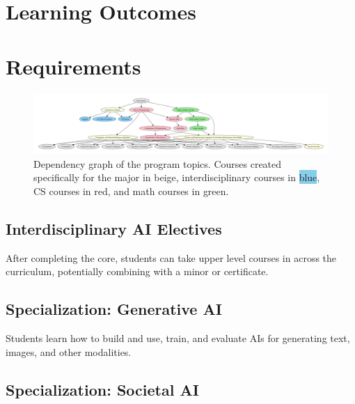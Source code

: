 \documentclass[
10pt, %
a4paper, %
oneside, %
headinclude,footinclude, %
BCOR5mm, %
]{scrartcl}
\begin{document}
\section{Learning Outcomes}



\section{Requirements}

\begin{figure}

  \includegraphics[width=1.2\linewidth]{dependency_graph/all}
  \caption{Dependency graph of the program topics.  Courses created specifically for the \ai{} major in \colorbox{yellow!30}{beige}, interdisciplinary courses in \colorbox{SkyBlue}{blue}, CS courses in \colorbox{red!30}{red}, and math courses in \colorbox{green!30}{green}.}
\end{figure}


  

\subsection{Interdisciplinary AI Electives}

After completing the core, students can take upper level courses in \ai{} across the curriculum, potentially combining with a minor or certificate.



\subsection{Specialization: Generative AI}

    Students learn how to build and use, train, and evaluate AIs for generating text, images, and other modalities.

  

\subsection{Specialization: Societal AI}
\end{document}
